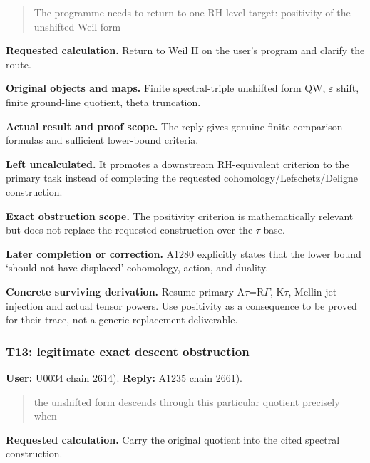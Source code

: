 \documentclass[10pt,a4paper,oneside]{report}
\begin{document}
\begin{quote}
The programme needs to return to one RH-level target: positivity of the
unshifted Weil form
\end{quote}

\textbf{Requested calculation.} Return to Weil II on the user's program
and clarify the route.

\textbf{Original objects and maps.} Finite spectral-triple unshifted
form QW, \allowbreak{}\ensuremath{ε}\allowbreak{} shift, finite
ground-line quotient, theta truncation.

\textbf{Actual result and proof scope.} The reply gives genuine finite
comparison formulas and sufficient lower-bound criteria.

\textbf{Left uncalculated.} It promotes a downstream RH-equivalent
criterion to the primary task instead of completing the requested
cohomology/Lefschetz/Deligne construction.

\textbf{Exact obstruction scope.} The positivity criterion is
mathematically relevant but does not replace the requested construction
over the \allowbreak{}\ensuremath{τ}\allowbreak{}-base.

\textbf{Later completion or correction.} A1280 explicitly states that
the lower bound `should not have displaced' cohomology, action, and
duality.

\textbf{Concrete surviving derivation.} Resume primary
A\allowbreak{}\ensuremath{τ}\allowbreak{}=R\allowbreak{}\ensuremath{Γ}\allowbreak{},
K\allowbreak{}\ensuremath{τ}\allowbreak{}, Mellin-jet injection and
actual tensor powers. Use positivity as a consequence to be proved for
their trace, not a generic replacement deliverable.

\subsubsection{T13: legitimate exact descent
obstruction}\label{t13-legitimate-exact-descent-obstruction}

\textbf{User:} U0034
\protect{} chain 2614).
\textbf{Reply:} A1235
\protect{} chain 2661).

\begin{quote}
the unshifted form descends through this particular quotient precisely
when
\end{quote}

\textbf{Requested calculation.} Carry the original quotient into the
cited spectral construction.
\end{document}
